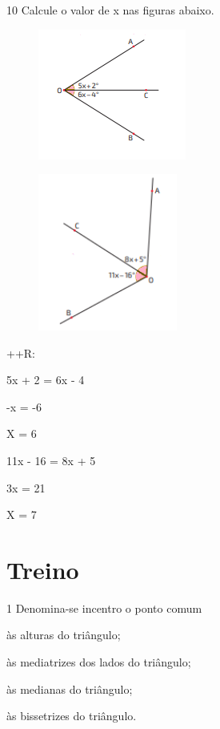 \num{10} Calcule o valor de x nas figuras abaixo.
\item
\begin{figure}[H]
\centering\includegraphics[width=1.91667in,height=1.6875in]{./imgSAEB_8_MAT/media/image33.png}
\end{figure}
\item
\begin{figure}[H]
\centering\includegraphics[width=1.80208in,height=2.02917in]{./imgSAEB_8_MAT/media/image34.png}
\end{figure}

++R:
\item

5x + 2 = 6x - 4

-x = -6

X = 6
\item

11x - 16 = 8x + 5

3x = 21

X = 7

\section{Treino}

\num{1} Denomina-se incentro o ponto comum
\item às alturas do triângulo;
\item às mediatrizes dos lados do triângulo;
\item às medianas do triângulo;
\item às bissetrizes do triângulo.

